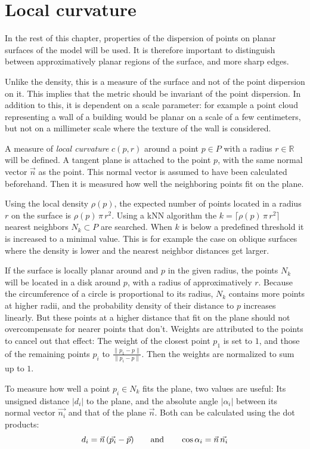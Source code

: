 \section{Local curvature} \label{sec:curvature}
In the rest of this chapter, properties of the dispersion of points on planar surfaces of the model will be used. It is therefore important to distinguish between approximatively planar regions of the surface, and more sharp edges.

Unlike the density, this is a measure of the surface and not of the point dispersion on it. This implies that the metric should be invariant of the point dispersion. In addition to this, it is dependent on a scale parameter: for example a point cloud representing a wall of a building would be planar on a scale of a few centimeters, but not on a millimeter scale where the texture of the wall is considered.

A measure of \emph{local curvature} $c(p, r)$ around a point $p \in P$ with a radius $r \in \mathbb{R}$ will be defined. A tangent plane is attached to the point $p$, with the same normal vector $\vec{n}$ as the point. This normal vector is assumed to have been calculated beforehand. Then it is measured how well the neighboring points fit on the plane.

Using the local density $\rho(p)$, the expected number of points located in a radius $r$ on the surface is $\rho(p) \, \pi \, r^2$. Using a kNN algorithm the $k = \lceil \rho(p) \, \pi \, r^2 \rceil$ nearest neighbors $N_k \subset P$ are searched. When $k$ is below a predefined threshold it is increased to a minimal value. This is for example the case on oblique surfaces where the density is lower and the nearest neighbor distances get larger.

If the surface is locally planar around and $p$ in the given radius, the points $N_k$ will be located in a disk around $p$, with a radius of approximatively $r$. Because the circumference of a circle is proportional to its radius, $N_k$ contains more points at higher radii, and the probability density of their distance to $p$ increases linearly. But these points at a higher distance that fit on the plane should not overcompensate for nearer points that don't. Weights are attributed to the points to cancel out that effect: The weight of the closest point $p_1$ is set to $1$, and those of the remaining points $p_i$ to $\frac{\| p_1 - p \|}{\| p_i - p \|}$. Then the weights are normalized to sum up to $1$.

To measure how well a point $p_i \in N_k$ fits the plane, two values are useful: Its unsigned distance $|d_i|$ to the plane, and the absolute angle $|\alpha_i|$ between its normal vector $\vec{n_i}$ and that of the plane $\vec{n}$. Both can be calculated using the dot products:
\begin{equation}
d_i = \vec{n} \, (\vec{p_i} - \vec{p})
\hspace{7mm} \text{and} \hspace{7mm}
\cos \alpha_i = \vec{n} \, \vec{n_i}
\end{equation} 

